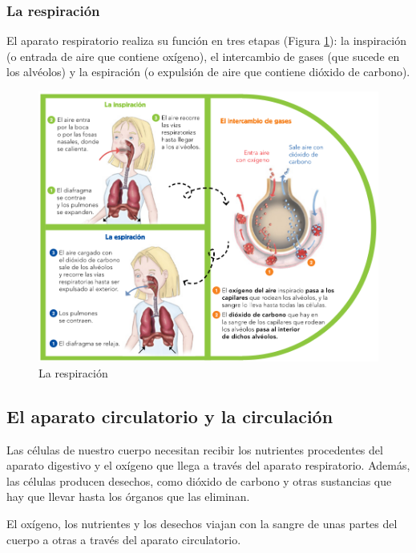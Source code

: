 \subsubsection{La respiración}

El aparato respiratorio realiza su función en tres etapas (Figura \ref{fig:respiracion}): la inspiración (o entrada de aire que contiene oxígeno), el intercambio de gases (que sucede en los alvéolos) y la espiración (o expulsión de aire que contiene dióxido de carbono).

\begin{figure}[!ht]
    \centering
    \includegraphics[width=1\linewidth]{Tema3/05_Respiracion.png}
    \caption{La respiración}
    \label{fig:respiracion}
\end{figure}

\subsection{El aparato circulatorio y la circulación}

Las células de nuestro cuerpo necesitan recibir los nutrientes procedentes del aparato digestivo y el oxígeno que llega a través del aparato respiratorio. Además, las células producen desechos, como dióxido de carbono y otras sustancias que hay que llevar hasta los órganos que las eliminan.

\vspace{3mm}
El oxígeno, los nutrientes y los desechos viajan con la sangre de unas partes del cuerpo a otras a través del aparato circulatorio.

